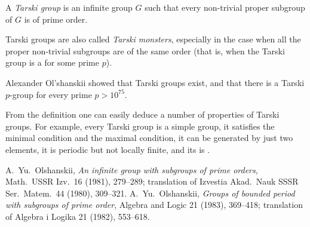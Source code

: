 \documentclass[12pt]{article}
\begin{document}

A \emph{Tarski group} is an infinite group $G$
such that every non-trivial proper subgroup of $G$ is of prime order.

Tarski groups are also called \emph{Tarski monsters},
especially in the case when 
all the proper non-trivial subgroups are of the same order 
(that is, when the Tarski group is 
a  for some prime $p$).

Alexander Ol'shanskii\cite{ol1,ol2} showed that Tarski groups exist,
and that there is a Tarski $p$-group for every prime $p > 10^{75}$.

From the definition one can easily deduce 
a number of properties of Tarski groups.
For example,
every Tarski group is a simple group, 
it satisfies the minimal condition and the maximal condition,
it can be generated by just two elements,
it is periodic but not locally finite,
and its  is .

\begin{thebibliography}{9}
 A.\ Yu.\ Olshanskii,
 {\it An infinite group with subgroups of prime orders},
 Math.\ USSR Izv.\ 16 (1981), 279--289;
 translation of Izvestia Akad.\ Nauk SSSR Ser.\ Matem.\ 44 (1980), 309--321. 
 A.\ Yu.\ Olshanskii,
 {\it Groups of bounded period with subgroups of prime order}, 
 Algebra and Logic 21 (1983), 369--418;
 translation of Algebra i Logika 21 (1982), 553--618.
\end{thebibliography}
\end{document}
